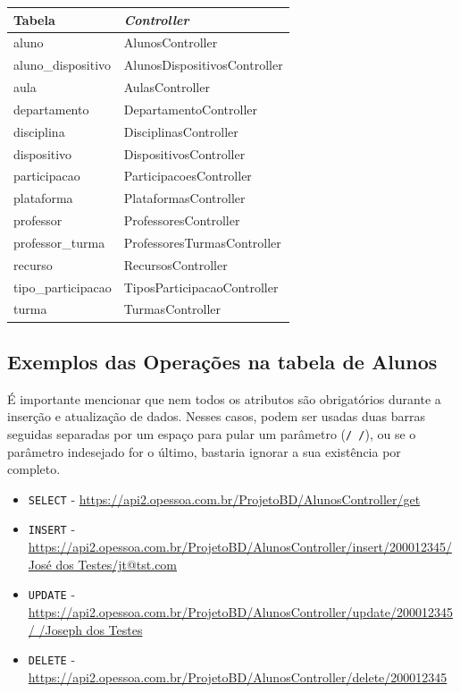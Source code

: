 \documentclass[12pt]{article}
\begin{document}
\begin{center}
    \begin{tabular}{|p{}|p{}|}
        \hline
        \textbf{Tabela} & \textbf{\textit{Controller}} \\
        \hline
        aluno & AlunosController \\
        \hline 
        aluno\_dispositivo & AlunosDispositivosController \\
        \hline  
        aula & AulasController \\
        \hline 
        departamento & DepartamentoController \\
        \hline
        disciplina & DisciplinasController \\
        \hline
        dispositivo & DispositivosController \\
        \hline
        participacao & ParticipacoesController \\
        \hline
        plataforma & PlataformasController \\
        \hline
        professor & ProfessoresController \\
        \hline
        professor\_turma & ProfessoresTurmasController \\
        \hline
        recurso & RecursosController \\
        \hline
        tipo\_participacao & TiposParticipacaoController \\
        \hline
        turma & TurmasController \\
        \hline
    \end{tabular}\label{mapeamento-controller}
\end{center}

\subsection*{Exemplos das Operações na tabela de Alunos}
É importante mencionar que nem todos os atributos são obrigatórios durante a inserção e atualização de dados. Nesses casos, podem ser usadas duas barras seguidas separadas por um espaço para pular um parâmetro (\texttt{/ /}), ou se o parâmetro indesejado for o último, bastaria ignorar a sua existência por completo.

\begin{itemize}
    \label{operacoes}
    \item \texttt{SELECT} - \url{https://api2.opessoa.com.br/ProjetoBD/AlunosController/get}
    \item \texttt{INSERT} - \url{https://api2.opessoa.com.br/ProjetoBD/AlunosController/insert/200012345/José dos Testes/jt@tst.com}
    \item \texttt{UPDATE} - \url{https://api2.opessoa.com.br/ProjetoBD/AlunosController/update/200012345/ /Joseph dos Testes}
    \item \texttt{DELETE} - \url{https://api2.opessoa.com.br/ProjetoBD/AlunosController/delete/200012345}
\end{itemize}
\end{document}
